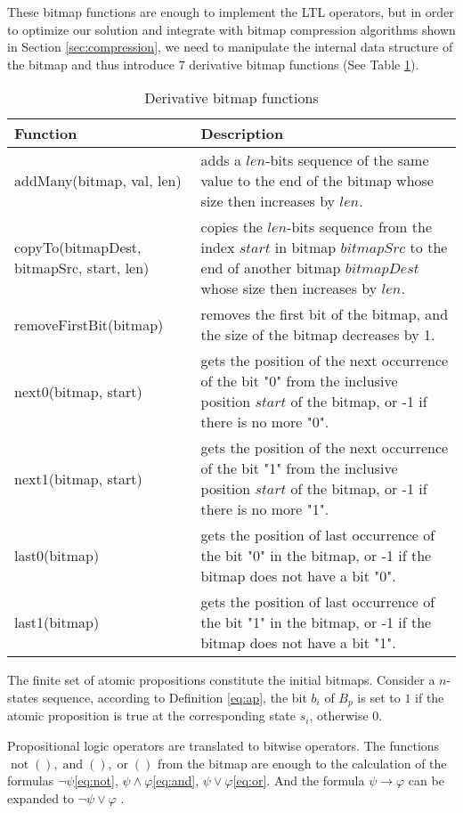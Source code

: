 These bitmap functions are enough to implement the LTL operators, but in order to optimize our solution and integrate with bitmap compression algorithms shown in Section \ref{sec:compression}, we need to manipulate the internal data structure of the bitmap and thus introduce 7 derivative bitmap functions (See Table \ref{tbl:bmhelpers}).
\begin{table}[h]
\centering
\begin{tabular}{|l|p{8cm}|}
\hline
Function & Description \\
\hline
addMany(bitmap, val, len) & adds a $len$-bits sequence of the same value to the end of the bitmap whose size then increases by $len$. \\
\hline
copyTo(bitmapDest, bitmapSrc, start, len) & copies the $len$-bits sequence from the index $start$ in bitmap $bitmapSrc$ to the end of another bitmap $bitmapDest$ whose size then increases by $len$. \\
\hline
removeFirstBit(bitmap) & removes the first bit of the bitmap, and the size of the bitmap decreases by 1. \\
\hline
next0(bitmap, start) & gets the position of the next occurrence of the bit "0" from the inclusive position $start$ of the bitmap, or -1 if there is no more "0". \\
\hline
next1(bitmap, start) & gets the position of the next occurrence of the bit "1" from the inclusive position $start$ of the bitmap, or -1 if there is no more "1". \\
\hline
last0(bitmap) & gets the position of last occurrence of the bit "0" in the bitmap, or -1 if the bitmap does not have a bit "0". \\
\hline
last1(bitmap) & gets the position of last occurrence of the bit "1" in the bitmap, or -1 if the bitmap does not have a bit "1". \\
\hline
\end{tabular}
\caption{Derivative bitmap functions}
\label{tbl:bmhelpers}
\end{table}

The finite set of atomic propositions constitute the initial bitmaps. Consider a $n$-states sequence, according to Definition \eqref{eq:ap}, the bit $b_i$ of $B_p$ is set to $1$ if the atomic proposition is true at the corresponding state $s_i$, otherwise 0.

Propositional logic operators are translated to bitwise operators. The functions $\mathop{not}(), \mathop{and}(), \mathop{or}()$ from the bitmap are enough to the calculation of the formulas $\neg\psi$\eqref{eq:not}, $\psi \wedge \varphi$\eqref{eq:and}, $\psi \vee \varphi$\eqref{eq:or}. And the formula $\psi \rightarrow \varphi$ can be expanded to $\neg \psi \vee \varphi$ \cite{huth2004}.

